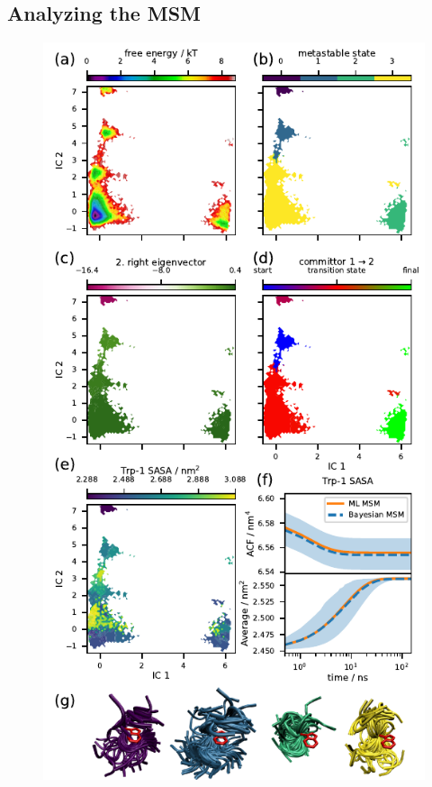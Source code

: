 \documentclass[9pt,tutorial]{livecoms}
\begin{document}
\subsection{Analyzing the MSM}

\begin{figure}
\includegraphics{figure_2}

\end{figure}
\end{document}
